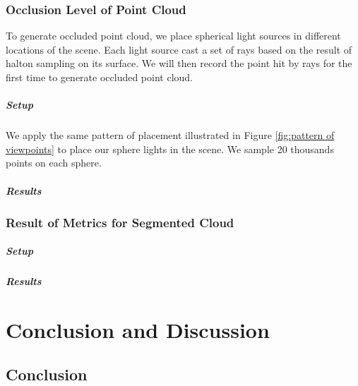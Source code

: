 \documentclass[11pt, a4paper,oneside,chapterprefix=false]{scrbook}
\begin{document}
\subsection{Occlusion Level of Point Cloud}

To generate occluded point cloud, we place spherical light sources in different locations of the scene. Each light source cast a set of rays based on the result of halton sampling on its surface. We will then record the point hit by rays for the first time to generate occluded point cloud.

\paragraph{Setup}

We apply the same pattern of placement illustrated in Figure \ref{fig:pattern of viewpoints} to place our sphere lights in the scene. We sample 20 thousands points on each sphere.

\paragraph{Results}



\subsection{Result of Metrics for Segmented Cloud}



\paragraph{Setup}



\paragraph{Results}




\chapter{Conclusion and Discussion} \label{chp:conclusion}

\section{Conclusion}
\end{document}
